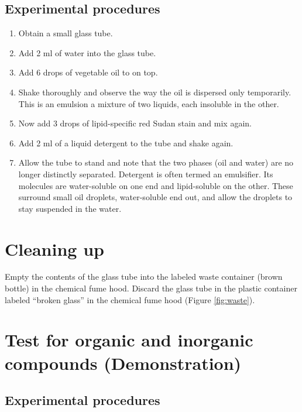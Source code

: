 \documentclass[]{book}
\providecommand{\tightlist}{%
  \setlength{\itemsep}{0pt}\setlength{\parskip}{0pt}}
\theoremstyle{definition}
\theoremstyle{definition}
\theoremstyle{definition}
\theoremstyle{remark}
\begin{document}
\subsection{Experimental procedures}\label{experimental-procedures-4}

\begin{enumerate}
\def\labelenumi{\arabic{enumi}.}
\tightlist
\item
  Obtain a small glass tube.
\item
  Add 2 ml of water into the glass tube.
\item
  Add 6 drops of vegetable oil to on top.
\item
  Shake thoroughly and observe the way the oil is dispersed only
  temporarily. This is an emulsion a mixture of two liquids, each
  insoluble in the other.
\item
  Now add 3 drops of lipid-specific red Sudan stain and mix again.
\item
  Add 2 ml of a liquid detergent to the tube and shake again.
\item
  Allow the tube to stand and note that the two phases (oil and water)
  are no longer distinctly separated. Detergent is often termed an
  emulsifier. Its molecules are water-soluble on one end and
  lipid-soluble on the other. These surround small oil droplets,
  water-soluble end out, and allow the droplets to stay suspended in the
  water.
\end{enumerate}

\section{Cleaning up}\label{cleaning-up-1}

Empty the contents of the glass tube into the labeled waste container
(brown bottle) in the chemical fume hood. Discard the glass tube in the
plastic container labeled ``broken glass'' in the chemical fume hood
(Figure \ref{fig:waste}).

\section{Test for organic and inorganic compounds
(Demonstration)}\label{test-for-organic-and-inorganic-compounds-demonstration}

\subsection{Experimental procedures}\label{experimental-procedures-5}
\end{document}
